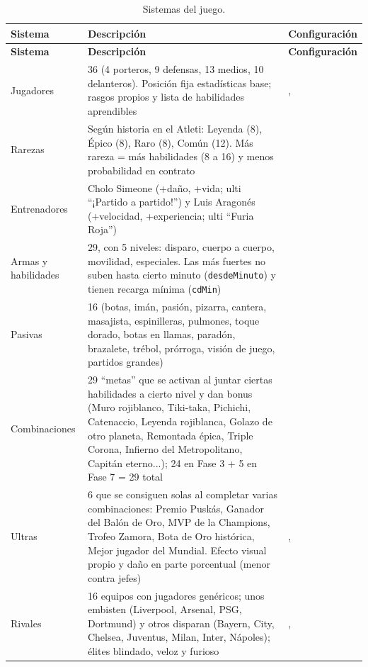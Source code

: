 \begin{longtable}{@{}L{2.2cm} L{5.8cm} L{3.0cm}@{}}
\caption{Sistemas del juego.}\label{tab:juego-sistemas}\\
\toprule
\textbf{Sistema} & \textbf{Descripción} & \textbf{Configuración} \\ \midrule \endfirsthead
\toprule
\textbf{Sistema} & \textbf{Descripción} & \textbf{Configuración} \\ \midrule \endhead
Jugadores & 36 (4 porteros, 9 defensas, 13 medios, 10 delanteros). Posición fija estadísticas base; rasgos propios y lista de habilidades aprendibles & ,  \\
Rarezas & Según historia en el Atleti: Leyenda (8), Épico (8), Raro (8), Común (12). Más rareza = más habilidades (8 a 16) y menos probabilidad en contrato &  \\
Entrenadores & Cholo Simeone (+daño, +vida; ulti ``¡Partido a partido!'') y Luis Aragonés (+velocidad, +experiencia; ulti ``Furia Roja'') &  \\
Armas y habilidades & 29, con 5 niveles: disparo, cuerpo a cuerpo, movilidad, especiales. Las más fuertes no suben hasta cierto minuto (\texttt{desde\allowbreak Minuto}) y tienen recarga mínima (\texttt{cd\allowbreak Min}) &  \\
Pasivas & 16 (botas, imán, pasión, pizarra, cantera, masajista, espinilleras, pulmones, toque dorado, botas en llamas, paradón, brazalete, trébol, prórroga, visión de juego, partidos grandes) &  \\
Combinaciones & 29 ``metas'' que se activan al juntar ciertas habilidades a cierto nivel y dan bonus (Muro rojiblanco, Tiki-taka, Pichichi, Catenaccio, Leyenda rojiblanca, Golazo de otro planeta, Remontada épica, Triple Corona, Infierno del Metropolitano, Capitán eterno...); 24 en Fase 3 + 5 en Fase 7 = 29 total &  \\
Ultras & 6 que se consiguen solas al completar varias combinaciones: Premio Puskás, Ganador del Balón de Oro, MVP de la Champions, Trofeo Zamora, Bota de Oro histórica, Mejor jugador del Mundial. Efecto visual propio y daño en parte porcentual (menor contra jefes) & ,  \\
Rivales & 16 equipos con jugadores genéricos; unos embisten (Liverpool, Arsenal, PSG, Dortmund) y otros disparan (Bayern, City, Chelsea, Juventus, Milan, Inter, Nápoles); élites blindado, veloz y furioso & ,  \\

\end{longtable}
